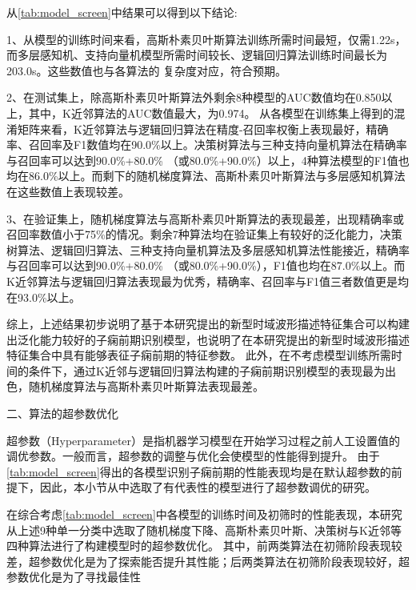 从\autoref{tab:model_screen}中结果可以得到以下结论:

1、从模型的训练时间来看，高斯朴素贝叶斯算法训练所需时间最短，仅需1.22s，而多层感知机、支持向量机模型所需时间较长、逻辑回归算法训练时间最长为203.0s。这些数值也与各算法的
复杂度对应，符合预期。

2、在测试集上，除高斯朴素贝叶斯算法外剩余8种模型的AUC数值均在0.850以上，其中，K近邻算法的AUC数值最大，为0.974。
从各模型在训练集上得到的混淆矩阵来看，K近邻算法与逻辑回归算法在精度-召回率权衡上表现最好，精确率、召回率及F1数值均在90.0\%以上。决策树算法与三种支持向量机算法在精确率与召回率可以达到90.0\%+80.0\%
（或80.0\%+90.0\%）以上，4种算法模型的F1值也均在86.0\%以上。而剩下的随机梯度算法、高斯朴素贝叶斯算法与多层感知机算法在这些数值上表现较差。

3、在验证集上，随机梯度算法与高斯朴素贝叶斯算法的表现最差，出现精确率或召回率数值小于75\%的情况。剩余7种算法均在验证集上有较好的泛化能力，决策树算法、逻辑回归算法、三种支持向量机算法及多层感知机算法性能接近，精确率与召回率可以达到90.0\%+80.0\%
（或80.0\%+90.0\%），F1值也均在87.0\%以上。而K近邻算法与逻辑回归算法表现最为优秀，精确率、召回率与F1值三者数值更是均在93.0\%以上。

综上，上述结果初步说明了基于本研究提出的新型时域波形描述特征集合可以构建出泛化能力较好的子痫前期识别模型，也说明了在本研究提出的新型时域波形描述特征集合中具有能够表征子痫前期的特征参数。
此外，在不考虑模型训练所需时间的条件下，通过K近邻与逻辑回归算法构建的子痫前期识别模型的表现最为出色，随机梯度算法与高斯朴素贝叶斯算法表现最差。

二、算法的超参数优化

超参数（Hyperparameter）是指机器学习模型在开始学习过程之前人工设置值的调优参数。一般而言，超参数的调整与优化会使模型的性能得到提升。
由于\autoref{tab:model_screen}得出的各模型识别子痫前期的性能表现均是在默认超参数的前提下，因此，本小节从中选取了有代表性的模型进行了超参数调优的研究。

在综合考虑\autoref{tab:model_screen}中各模型的训练时间及初筛时的性能表现，本研究从上述9种单一分类中选取了随机梯度下降、高斯朴素贝叶斯、决策树与K近邻等四种算法进行了构建模型时的超参数优化。
其中，前两类算法在初筛阶段表现较差，超参数优化是为了探索能否提升其性能；后两类算法在初筛阶段表现较好，超参数优化是为了寻找最佳性

